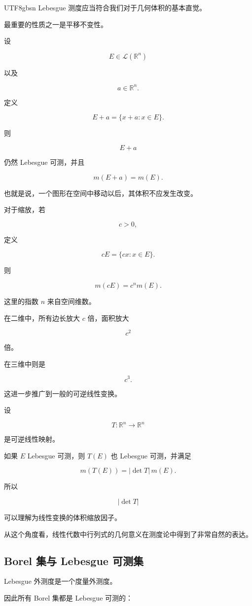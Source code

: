 \documentclass[11pt]{article}
\begin{document}
\begin{CJK*}{UTF8}{gbsn}
Lebesgue 测度应当符合我们对于几何体积的基本直觉。

最重要的性质之一是平移不变性。

设

\[
E\in\mathcal{L}(\mathbb{R}^{n})
\]

以及

\[
a\in\mathbb{R}^{n}.
\]

定义

\[
E+a=\{x+a:x\in E\}.
\]

则

\[
E+a
\]

仍然 Lebesgue 可测，并且

\[
m(E+a)=m(E).
\]

也就是说，一个图形在空间中移动以后，其体积不应发生改变。

对于缩放，若

\[
c>0,
\]

定义

\[
cE=\{cx:x\in E\}.
\]

则

\[
m(cE)=c^{n}m(E).
\]

这里的指数 $n$ 来自空间维数。

在二维中，所有边长放大 $c$ 倍，面积放大

\[
c^{2}
\]

倍。

在三维中则是

\[
c^{3}.
\]

这进一步推广到一般的可逆线性变换。

设

\[
T:\mathbb{R}^{n}\rightarrow\mathbb{R}^{n}
\]

是可逆线性映射。

如果 $E$ Lebesgue 可测，则 $T(E)$ 也 Lebesgue 可测，并满足

\[
m(T(E))=|\det T|\,m(E).
\]

所以

\[
|\det T|
\]

可以理解为线性变换的体积缩放因子。

从这个角度看，线性代数中行列式的几何意义在测度论中得到了非常自然的表达。

\subsection{Borel 集与 Lebesgue 可测集}

Lebesgue 外测度是一个度量外测度。

因此所有 Borel 集都是 Lebesgue 可测的：


\end{CJK*}
\end{document}

